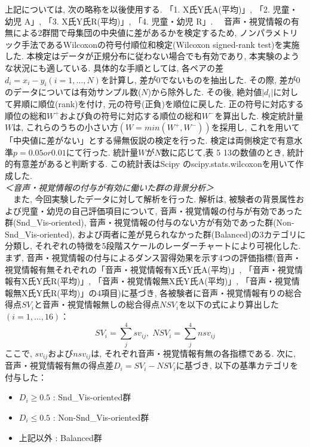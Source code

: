 \documentclass[paper]{ieicej}
\begin{document}
上記については, 次の略称を以後使用する. 「1. X氏Y氏A(平均)」, 「2. 児童・幼児 A」, 「3. X氏Y氏R(平均)」, 「4. 児童・幼児 R」. 
　音声・視覚情報の有無による2群間で母集団の中央値に差があるかを検定するため, ノンパラメトリック手法であるWilcoxonの符号付順位和検定(Wilcoxon signed-rank test)を実施した. 本検定はデータが正規分布に従わない場合でも有効であり, 本実験のような状況にも適している. 具体的な手順としては, 各ペアの差$d_{i}=x_{i}-y_{i} (i=1,\dots,N)$を計算し, 差が0でないものを抽出した. その際, 差が0のデータについては有効サンプル数($N$)から除外した. その後, 絶対値$|d_{i}|$に対して昇順に順位(rank)を付け, 元の符号(正負)を順位に戻した. 正の符号に対応する順位の総和$W^+$および負の符号に対応する順位の総和$W^-$を算出した. 検定統計量$W$は, これらのうちの小さい方$(W=min⁡(W^+,W^-))$を採用し, これを用いて「中央値に差がない」とする帰無仮説の検定を行った. 検定は両側検定で有意水準$p=0.05 or 0.01$にて行った. 統計量$W$が$N$数に応じて,表 5 13の数値のとき, 統計的有意差があると判断する. この統計表はScipy \cite{ref27}のscipy.stats.wilcoxonを用いて作成した. \\
\textit{＜音声・視覚情報の付与が有効に働いた群の背景分析＞}\\
　また, 今回実験したデータに対して解析を行った. 解析は, 被験者の背景属性および児童・幼児の自己評価項目について, 音声・視覚情報の付与が有効であった群(Snd\_Vis-oriented), 音声・視覚情報の付与のない方が有効であった群(Non-Snd\_Vis-oriented), および両者に差が見られなかった群(Balanced)の3カテゴリに分類し, それぞれの特徴を5段階スケールのレーダーチャートにより可視化した. まず, 音声・視覚情報の付与によるダンス習得効果を示す4つの評価指標(音声・視覚情報有無それぞれの「音声・視覚情報有X氏Y氏A(平均)」, 「音声・視覚情報有X氏Y氏R(平均)」, 「音声・視覚情報無X氏Y氏A(平均)」, 「音声・視覚情報無X氏Y氏R(平均)」の4項目)に基づき, 各被験者に音声・視覚情報有りの総合得点$SV_{i}$と音声・視覚情報無しの総合得点$NSV_{i}$を以下の式により算出した$(i=1,\dots,16)$：
\begin{equation}
  SV_{i}=\sum_{j}^{4}sv_{ij},\; NSV_{i}=\sum_{j}^{4}nsv_{ij}
\end{equation}
ここで, $sv_{ij}$および$nsv_{ij}$は, それぞれ音声・視覚情報有無の各指標である. 次に, 音声・視覚情報有無の得点差$D_{i}=SV_{i}-NSV_{i}$に基づき, 以下の基準カテゴリを付与した：
\begin{itemize}[nosep]
  \item $D_{i} \geq 0.5$ : Snd\_Vis-oriented群
  \item $D_{i} \leq 0.5$ : Non-Snd\_Vis-oriented群
  \item 上記以外 : Balanced群
\end{itemize}
\end{document}
